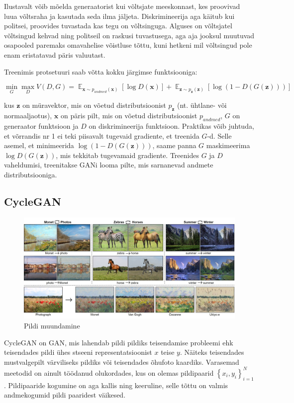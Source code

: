 \documentclass{vilgym}
\DeclareMathOperator{\EX}{\mathbb{E}}
\begin{document}
	Ilustavalt võib mõelda generaatorist kui võltsjate meeskonnast, kes proovivad luua võltsraha ja kasutada seda ilma jäljeta. Diskrimineerija aga käitub kui politsei, proovides tuvastada kas tegu on võltsinguga. Alguses on võltsjatel võltsingud kehvad ning politseil on raskusi tuvastusega, aga aja jooksul muutuvad osapooled paremaks omavahelise võistluse tõttu, kuni hetkeni mil võltsingud pole enam eristatavad päris valuutast.

	Treenimis protsetuuri saab võtta kokku järgimse funktsiooniga:

	\begin{equation}
		\operatorname*{min}_G \operatorname*{max}_D V(D,G) = \EX_{\boldsymbol{x}\sim p_{andmed}(\boldsymbol{x})}[\log D(\boldsymbol{x})] + \EX_{\boldsymbol{z}\sim p_{\boldsymbol{z}}(\boldsymbol{z})}[\log(1-D(G(\boldsymbol{z})))]
	\end{equation}

	kus $ \boldsymbol{z} $ on müravektor, mis on võetud distributsioonist $ p_{\boldsymbol{z}} $ (nt. ühtlane- või normaaljaotus), $ \boldsymbol{x} $ on päris pilt, mis on võetud distributsioonist $ p_{andmed} $, $ G $ on generaator funktsioon ja $ D $ on diskrimineerija funktsioon. Praktikas võib juhtuda, et võrrandis nr 1 ei teki piisavalt tugevaid gradiente, et treenida $ G $-d. Selle asemel, et minimeerida $ \log (1 - D(G(\boldsymbol{z}))) $, saame panna $ G $ maskimeerima $ \log D(G(\boldsymbol{z})) $, mis tekkitab tugevamaid gradiente. Treenides $ G $ ja $ D $ vaheldumisi, treenitakse GANi looma pilte, mis sarnanevad andmete distributsiooniga. \parencite{gan}

	\subsection{CycleGAN}
	\begin{figure}
		\centering
			\includegraphics[width=\linewidth]{images/cyclegan.jpg}
			\caption{Pildi muundamine}
			\label{fig:cyclegan}
	\end{figure}
	CycleGAN on GAN, mis lahendab pildi pildiks teisendamise probleemi ehk teisendades pildi ühes stseeni representatsioonist $ x $ teise $ y $. Näiteks teisendades mustvalgepilt värviliseks pildiks või teisendades õhufoto kaardiks. Varasemad meetodid on ainult töödanud olukordades, kus on olemas pildipaarid $ \left\{x_i,y_i\right\}_{i=1}^N $. Pildipaaride kogumine on aga kallis ning keeruline, selle tõttu on valmis andmekogumid pildi paaridest väikesed.
\end{document}

